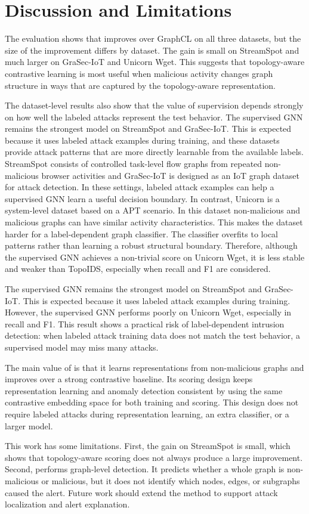 \section{Discussion and Limitations}\label{sec:discussion}

The evaluation shows that \sysname{} improves over GraphCL on all three datasets, but the size of the improvement differs by dataset. The gain is small on StreamSpot and much larger on GraSec-IoT and Unicorn Wget. This suggests that topology-aware contrastive learning is most useful when malicious activity changes graph structure in ways that are captured by the topology-aware representation.

The dataset-level results also show that the value of supervision depends strongly on how well the labeled attacks represent the test behavior. The supervised GNN remains the strongest model on StreamSpot and GraSec-IoT. This is expected because it uses labeled attack examples during training, and these datasets provide attack patterns that are more directly learnable from the available labels. StreamSpot consists of controlled task-level flow graphs from repeated non-malicious browser activities and GraSec-IoT is designed as an IoT graph dataset for attack detection. In these settings, labeled attack examples can help a supervised GNN learn a useful decision boundary. In contrast, Unicorn is a system-level dataset based on a APT scenario. In this dataset non-malicious and malicious graphs can have similar activity characteristics. This makes the dataset harder for a label-dependent graph classifier. The classifier overfits to local patterns rather than learning a robust structural boundary. Therefore, although the supervised GNN achieves a non-trivial score on Unicorn Wget, it is less stable and weaker than TopoIDS, especially when recall and F1 are considered.


The supervised GNN remains the strongest model on StreamSpot and GraSec-IoT. This is expected because it uses labeled attack examples during training. However, the supervised GNN performs poorly on Unicorn Wget, especially in recall and F1. This result shows a practical risk of label-dependent intrusion detection: when labeled attack training data does not match the test behavior, a supervised model may miss many attacks.

The main value of \sysname{} is that it learns representations from non-malicious graphs and improves over a strong contrastive baseline. Its scoring design keeps representation learning and anomaly detection consistent by using the same contrastive embedding space for both training and scoring. This design does not require labeled attacks during representation learning, an extra classifier, or a larger model.

This work has some limitations. First, the gain on StreamSpot is small, which shows that topology-aware scoring does not always produce a large improvement. Second, \sysname{} performs graph-level detection. It predicts whether a whole graph is non-malicious or malicious, but it does not identify which nodes, edges, or subgraphs caused the alert. Future work should extend the method to support attack localization and alert explanation.